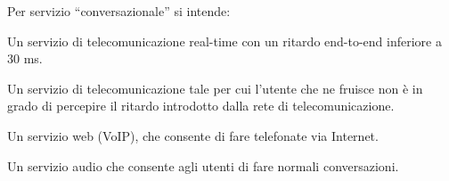 \question
Per servizio \enquote{conversazionale} si intende:

\begin{checkboxes}
	\choice Un servizio di telecomunicazione real-time con un ritardo end-to-end inferiore a 30 ms.

	\CorrectChoice Un servizio di telecomunicazione tale per cui l'utente che ne fruisce non è in grado di percepire il ritardo introdotto dalla rete di telecomunicazione.

	\choice Un servizio web (VoIP), che consente di fare telefonate via Internet.

	\choice Un servizio audio che consente agli utenti di fare normali conversazioni.
\end{checkboxes}
